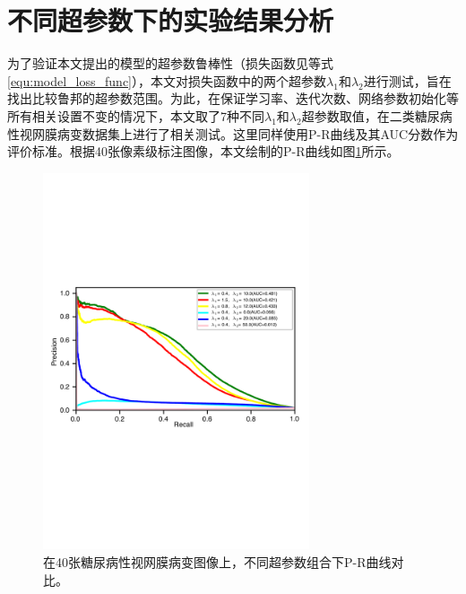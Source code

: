 \section{不同超参数下的实验结果分析}\label{sec:hyper_paras}
为了验证本文提出的模型的超参数鲁棒性（损失函数见等式\ref{equ:model_loss_func}），本文对损失函数中的两个超参数$\lambda_{1}$和$\lambda_{2}$进行测试，旨在找出比较鲁邦的超参数范围。为此，在保证学习率、迭代次数、网络参数初始化等所有相关设置不变的情况下，本文取了7种不同$\lambda_{1}$和$\lambda_{2}$超参数取值，在二类糖尿病性视网膜病变数据集上进行了相关测试。这里同样使用P-R曲线及其AUC分数作为评价标准。根据40张像素级标注图像，本文绘制的P-R曲线如图\ref{fig:pr_curve_retinal_hyper_paras}所示。
\begin{figure}[h]
	\centering
	\includegraphics[width=0.7\textwidth]{figure/pr_curve_retinal_hyper_paras/pr_curve.pdf}
	\caption[不同超参数组合下P-R曲线对比]{在40张糖尿病性视网膜病变图像上，不同超参数组合下P-R曲线对比。}
	\label{fig:pr_curve_retinal_hyper_paras}
\end{figure}

